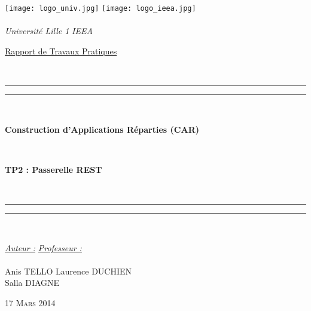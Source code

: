 \thispagestyle{cover}

\texttt{[image: logo\_univ.jpg]} \hfill \texttt{[image: logo\_ieea.jpg]} \\
~\\
\hspace*{0.5cm} {\Large \textit{Université Lille 1}} \hfill {\Large \textit{IEEA}} \hspace*{0.5cm}\\

\vspace*{17mm}

\begin{center}
	\begin{Huge} \underline{Rapport de Travaux Pratiques} \end{Huge}\\[4mm]

	\vspace*{15mm}

	\rule[0.5ex]{\linewidth}{2pt}\vspace*{-\baselineskip}\vspace*{3.2pt}
	\rule[0.5ex]{\linewidth}{1pt}\\[\baselineskip]

		\begin{Huge} \textbf{Construction d'Applications Réparties (CAR)} \end{Huge}\\[4mm]
		\begin{Huge} \textbf{TP2 : Passerelle REST} \end{Huge}\\[4mm]

	\rule[0.5ex]{\linewidth}{1pt}\vspace*{-\baselineskip}\vspace{3.2pt}
	\rule[0.5ex]{\linewidth}{2pt}\\

	\vspace*{20mm}

	{\large \textit{\underline{Auteur :}}} \hfill {\large \textit{\underline{Professeur :}}}\\
	~\\
	{\large Anis TELLO} \hfill {\large Laurence DUCHIEN}\\
	{\large Salla DIAGNE} \hfill {\large}
	
	\vspace*{20mm}
	
	{\large\textsc{17 Mars 2014}}
\end{center}